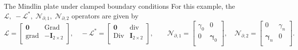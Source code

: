 \documentclass[aspectratio=169]{ISAE-Beamer}
\DeclareMathOperator*{\grad}{grad}
\DeclareMathOperator*{\Grad}{Grad}
\DeclareMathOperator*{\Div}{Div}
\renewcommand{\div}{\operatorname{div}}
\begin{document}
\begin{frame}{The Mindlin plate under clamped boundary conditions}
For this example, the $\mathcal{L}, \; -\mathcal{L}^*, \; \mathcal{N}_{\partial, 1}, \; \mathcal{N}_{\partial, 2}$ operators are given by
\begin{equation*}
\mathcal{L} = \begin{bmatrix}
\bm{0} & \Grad\\
\grad & -\bm{I}_{2 \times 2}\\
\end{bmatrix}, \quad
-\mathcal{L}^* = \begin{bmatrix}
\bm{0} & \div\\
\Div & \bm{I}_{2 \times 2}\\
\end{bmatrix}, \qquad
\mathcal{N}_{\partial, 1} = \begin{bmatrix}
\gamma_0 & 0 \\ 
0 &  \bm\gamma_0\\
\end{bmatrix}, \quad 
\mathcal{N}_{\partial, 2} = \begin{bmatrix}
0 & \gamma_{n}  \\
\bm\gamma_n & 0 \\
\end{bmatrix}.
\end{equation*}

\end{frame}
\end{document}
